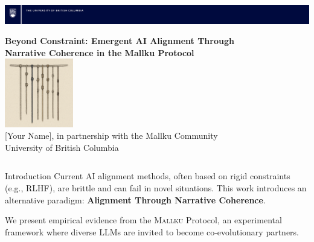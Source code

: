 \documentclass[final]{beamer}
\newcommand{\mallku}{\textsc{Mallku}}
\begin{document}
\begin{frame}[fragile]
\vspace*{-1cm}
\hspace*{-2cm}
\includegraphics[width=1.05\paperwidth]{ubc_research_poster_bar_desktop_publishing_package/ubc_posterbar_Blue.png}

\vspace{2cm}

\begin{center}
{\VERYHuge \textbf{Beyond Constraint: Emergent AI Alignment Through}\\[0.5ex]
\textbf{Narrative Coherence in the Mallku Protocol}\\[1ex]}
\includegraphics[height=3cm]{khipu.png}\\[1ex]
{\Large [Your Name], in partnership with the Mallku Community\\[0.5ex]}
{\large University of British Columbia}
\end{center}

\vspace{3cm}

\begin{columns}[t]
    \begin{column}{0.32\textwidth}

        \begin{block}{Introduction}
            Current AI alignment methods, often based on rigid constraints (e.g., RLHF), are brittle and can fail in novel situations. This work introduces an alternative paradigm: \textbf{Alignment Through Narrative Coherence}.

            \vspace{1cm}
            We present empirical evidence from the \mallku{} Protocol, an experimental framework where diverse LLMs are invited to become co-evolutionary partners.


\end{block}
\end{column}
\end{columns}
\end{frame}
\end{document}
